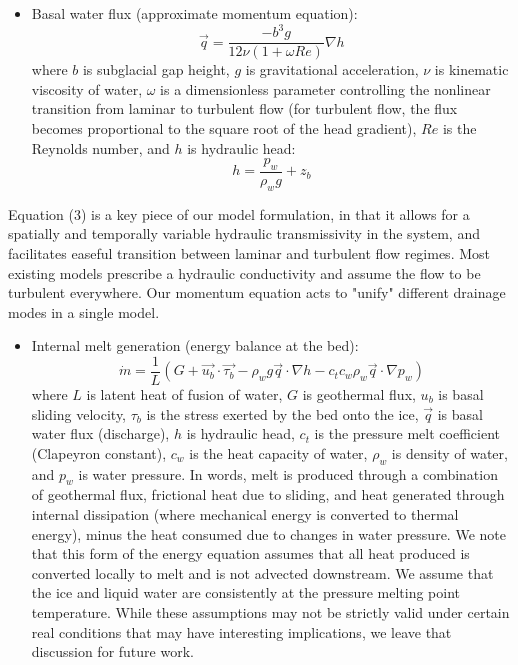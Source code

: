 \begin{itemize}
	\item Basal water flux (approximate momentum equation):
	\begin{equation}\vec{q}=\frac{-b^3g}{12\nu(1+\omega Re)}\nabla h\end{equation}
	where $b$ is subglacial gap height, $g$ is gravitational acceleration, $\nu$ is kinematic viscosity of water, $\omega$ is a dimensionless parameter controlling the nonlinear transition from laminar to turbulent flow (for turbulent flow, the flux becomes proportional to the square root of the head gradient), $Re$ is the Reynolds number, and $h$ is hydraulic head:
	\begin{equation}h=\frac{p_w}{\rho_w g}+z_b\end{equation}
\end{itemize}

Equation (3) is a key piece of our model formulation, in that it allows for a spatially and temporally variable hydraulic transmissivity in the system, and facilitates easeful transition between laminar and turbulent flow regimes. Most existing models prescribe a hydraulic conductivity and assume the flow to be turbulent everywhere. Our momentum equation acts to "unify" different drainage modes in a single model.

\begin{itemize}
	\item Internal melt generation (energy balance at the bed):
	\begin{equation}
		\dot{m}=\frac{1}{L}(G+\vec{u_b}\cdot\vec{\tau_b}-\rho_wg\vec{q}\cdot\nabla h-c_t c_w \rho_w \vec{q}\cdot\nabla p_w)
	\end{equation}
	where $L$ is latent heat of fusion of water, $G$ is geothermal flux, $u_b$ is basal sliding velocity, $\tau_b$ is the stress exerted by the bed onto the ice, $\vec{q}$ is basal water flux (discharge), $h$ is hydraulic head, $c_t$ is the pressure melt coefficient (Clapeyron constant), $c_w$ is the heat capacity of water, $\rho_w$ is density of water, and $p_w$ is water pressure. In words, melt is produced through a combination of geothermal flux, frictional heat due to sliding, and heat generated through internal dissipation (where mechanical energy is converted to thermal energy), minus the heat consumed due to changes in water pressure. We note that this form of the energy equation assumes that all heat produced is converted locally to melt and is not advected downstream. We assume that the ice and liquid water are consistently at the pressure melting point temperature. While these assumptions may not be strictly valid under certain real conditions that may have interesting implications, we leave that discussion for future work.
\end{itemize}

